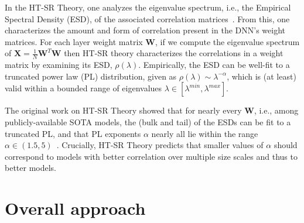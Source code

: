 \documentclass{article}
\begin{document}
In the HT-SR Theory, one analyzes the eigenvalue spectrum, i.e., the Empirical Spectral Density (ESD), of the associated correlation matrices~\citep{MM18_TR,MM19_HTSR_ICML,MM20_SDM}.
From this, one characterizes the amount and form of correlation present in the DNN's weight matrices.
For each layer weight matrix $\mathbf{W}$, if we compute the eigenvalue spectrum of 
$ \mathbf{X} = \frac{1}{N}\mathbf{W}^{T}\mathbf{W} $
then HT-SR theory characterizes the correlations in a weight matrix by examining its ESD, $\rho(\lambda)$.
Empirically, the ESD can be well-fit to a truncated power law (PL) distribution, given as
$\rho(\lambda)\sim\lambda^{-\alpha} $,
which is (at least) valid within a bounded range of eigenvalues $\lambda\in[\lambda^{min},\lambda^{max}]$.  

The original work on HT-SR Theory showed that for nearly every $\mathbf{W}$, i.e., among publicly-available SOTA models, the (bulk and tail) of the ESDs can be fit to a truncated PL, and that PL exponents $\alpha$ nearly all lie within the range $\alpha\in(1.5,5)$~\citep{MM18_TR,MM19_HTSR_ICML,MM20_SDM}.
%
%
Crucially, HT-SR Theory predicts that smaller values of $\alpha$ should correspond to models with better correlation over multiple size scales and thus to better models.


\section{Overall approach}
\end{document}
